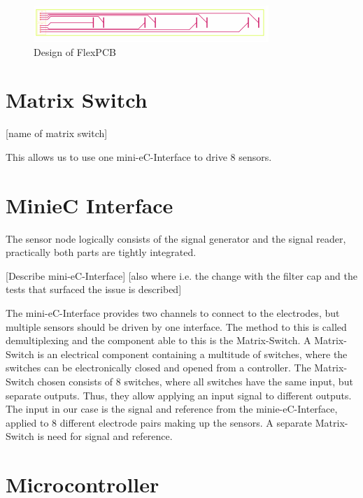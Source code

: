 \begin{figure}
	\begin{center}
		\includegraphics[width=\textwidth]{images/fpcbd.pdf} 
		\caption{Design of FlexPCB}
		\label{fig:fpcbd}
	\end{center}
\end{figure}

\section{Matrix Switch}

[name of matrix switch]

This allows us to use one mini-eC-Interface to drive 8 sensors.

\section{MinieC Interface}

The sensor node logically consists of the signal generator and the signal reader, practically both parts are tightly integrated.

[Describe mini-eC-Interface]
[also where i.e. the change with the filter cap and the tests that surfaced the issue is described]

The mini-eC-Interface provides two channels to connect to the electrodes, but  multiple sensors should be driven by one interface. The method to this is called demultiplexing and the component able to this is the Matrix-Switch.
A Matrix-Switch is an electrical component containing a multitude of switches, where the switches can be electronically closed and opened from a controller. The Matrix-Switch chosen consists of 8 switches, where all switches have the same input, but separate outputs. Thus, they allow applying an input signal to different outputs. The input in our case is the signal and reference from the minie-eC-Interface, applied to 8 different electrode pairs making up the sensors. A separate Matrix-Switch is need for signal and reference.

\section{Microcontroller}

